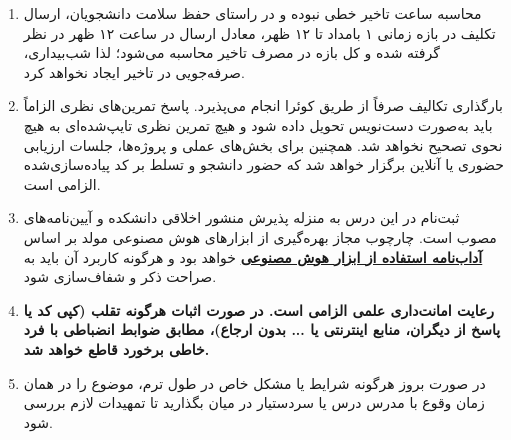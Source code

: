 \documentclass[a4paper,11pt]{article}
\begin{document}
\begin{enumerate}[label=\textbf{\arabic*.}]
    \item محاسبه ساعت تاخیر خطی نبوده و در راستای حفظ سلامت دانشجویان، ارسال تکلیف در بازه زمانی ۱ بامداد تا ۱۲ ظهر، معادل ارسال در ساعت ۱۲ ظهر در نظر گرفته شده و کل بازه در مصرف تاخیر محاسبه می‌شود؛ لذا شب‌بیداری، صرفه‌جویی در تاخیر ایجاد نخواهد کرد.

    \item بارگذاری تکالیف صرفاً از طریق کوئرا انجام می‌پذیرد. پاسخ تمرین‌های نظری الزاماً باید به‌صورت دست‌نویس تحویل داده شود و هیچ تمرین نظری تایپ‌شده‌ای به هیچ نحوی تصحیح نخواهد شد. همچنین برای بخش‌های عملی و پروژه‌ها، جلسات ارزیابی حضوری یا آنلاین برگزار خواهد شد که حضور دانشجو و تسلط بر کد پیاده‌سازی‌شده الزامی است.

    \item ثبت‌نام در این درس به منزله پذیرش منشور اخلاقی دانشکده و آیین‌نامه‌های مصوب است. چارچوب مجاز بهره‌گیری از ابزارهای هوش مصنوعی مولد بر اساس \href{https://ac.sharif.edu/rules/ai-ethics}{\textbf{آداب‌نامه استفاده از ابزار هوش مصنوعی}} خواهد بود و هرگونه کاربرد آن باید به صراحت ذکر و شفاف‌سازی شود.

    \item \textbf{رعایت امانت‌داری علمی الزامی است. در صورت اثبات هرگونه تقلب (کپی کد یا پاسخ از دیگران، منابع اینترنتی یا ... بدون ارجاع)، مطابق ضوابط انضباطی با فرد خاطی برخورد قاطع خواهد شد.}

    \item در صورت بروز هرگونه شرایط یا مشکل خاص در طول ترم، موضوع را در همان زمان وقوع با مدرس درس یا سردستیار در میان بگذارید تا تمهیدات لازم بررسی شود.
\end{enumerate}
\end{document}
